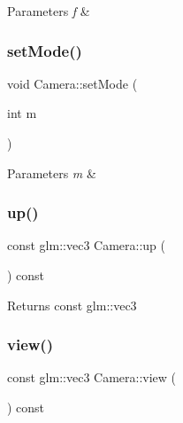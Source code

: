 \begin{DoxyParams}{Parameters}
{\em f} & \\
\hline
\end{DoxyParams}
\mbox{\label{class_camera_a9a436317f1a6e867f8eaa6affd6e80e5}} 
\subsubsection{\texorpdfstring{set\+Mode()}{setMode()}}
{\footnotesize\ttfamily void Camera\+::set\+Mode (\begin{DoxyParamCaption}\item[{int}]{m }\end{DoxyParamCaption})}


\begin{DoxyParams}{Parameters}
{\em m} & \\
\hline
\end{DoxyParams}
\mbox{\label{class_camera_adbbc2231e34b78b5b5b08a2aa16fc71d}} 
\subsubsection{\texorpdfstring{up()}{up()}}
{\footnotesize\ttfamily const glm\+::vec3 Camera\+::up (\begin{DoxyParamCaption}{ }\end{DoxyParamCaption}) const\hspace{0.3cm}{\ttfamily [inline]}}

\begin{DoxyReturn}{Returns}
const glm\+::vec3 
\end{DoxyReturn}
\mbox{\label{class_camera_abbd1a0e73fd627b08d357524a7f1b8ab}} 
\subsubsection{\texorpdfstring{view()}{view()}}
{\footnotesize\ttfamily const glm\+::vec3 Camera\+::view (\begin{DoxyParamCaption}{ }\end{DoxyParamCaption}) const\hspace{0.3cm}{\ttfamily [inline]}}

